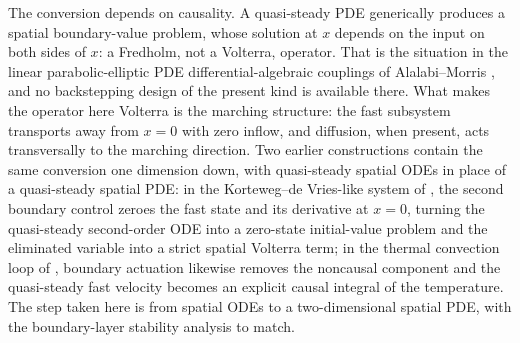 \documentclass[12pt]{article}
\theoremstyle{plain}
\theoremstyle{remark}
\begin{document}
The conversion depends on causality. A quasi-steady PDE generically produces a spatial boundary-value problem, whose solution at $x$ depends on the input on both sides of $x$: a Fredholm, not a Volterra, operator. That is the situation in the linear parabolic-elliptic PDE differential-algebraic couplings of Alalabi--Morris \cite{AlalabiMorris2024,AlalabiMorris2025}, and no backstepping design of the present kind is available there. What makes the operator here Volterra is the marching structure: the fast subsystem transports away from $x=0$ with zero inflow, and diffusion, when present, acts transversally to the marching direction. Two earlier constructions contain the same conversion one dimension down, with quasi-steady spatial ODEs in place of a quasi-steady spatial PDE: in the Korteweg--de Vries-like system of \cite{KrsticSmyshlyaevBook2008,KrsticSmyshlyaev2008}, the second boundary control zeroes the fast state and its derivative at $x=0$, turning the quasi-steady second-order ODE into a zero-state initial-value problem and the eliminated variable into a strict spatial Volterra term; in the thermal convection loop of \cite{VazquezKrstic2006}, boundary actuation likewise removes the noncausal component and the quasi-steady fast velocity becomes an explicit causal integral of the temperature. The step taken here is from spatial ODEs to a two-dimensional spatial PDE, with the boundary-layer stability analysis to match.
\end{document}
